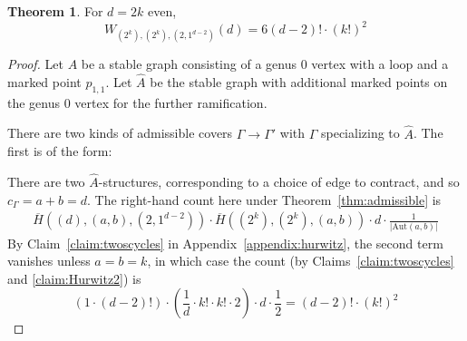\documentclass[11pt]{article}           %
\newcommand{\Aut}{\text{Aut}}
\theoremstyle{definition}
\newtheorem{thm}{Theorem}[section]
\begin{document}
\begin{thm}
  \label{thm:genusreduction3}
  For $d=2k$ even,
  \[
  W_{(2^k),(2^k),(2,1^{d-2})}(d)=6(d-2)!\cdot (k!)^2
  \]
\end{thm}
\begin{proof}
  Let $A$ be a stable graph consisting of a genus $0$ vertex with a loop and a marked point $p_{1,1}$.
  Let $\hat A$ be the stable graph with additional marked points on the genus $0$ vertex for
  the further ramification.

There are two kinds of
admissible covers $\Gamma\to\Gamma'$ with $\Gamma$ specializing to $\hat A$. The first
is of the form:


            There are two $\hat A$-structures, corresponding to a choice
            of edge to contract, and so $c_{\Gamma}=a+b=d$. The right-hand count here under Theorem~\ref{thm:admissible} is
            \begin{align*}
              \overline H((d),(a,b),(2,1^{d-2}))\cdot \overline H((2^k),(2^k),(a,b))\cdot d\cdot\frac 1{|\Aut(a,b)|}
            \end{align*}
            By Claim~\ref{claim:twoscycles} in Appendix~\ref{appendix:hurwitz}, the second term vanishes unless $a=b=k$, in which case
            the count (by Claims~\ref{claim:twoscycles} and \ref{claim:Hurwitz2}) is
            \[
            (1\cdot (d-2)!)\cdot \left(\frac 1d\cdot k!\cdot k!\cdot 2\right)\cdot d\cdot\frac 12
            =(d-2)!\cdot (k!)^2
            \]


\end{proof}
\end{document}
